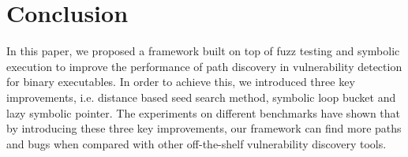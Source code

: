 \documentclass[a4paper]{article}
\begin{document}
\section{Conclusion} \label{sec:conclusion}
In this paper, we proposed a framework built on top of fuzz testing and symbolic execution to improve the performance of path discovery in vulnerability detection for binary executables. In order to achieve this, we introduced three key improvements, i.e. distance based seed search method, symbolic loop bucket and lazy symbolic pointer. The experiments on different benchmarks have shown that by introducing these three key improvements, our framework can find more paths and bugs when compared with other off-the-shelf vulnerability discovery tools. 



\end{document}
